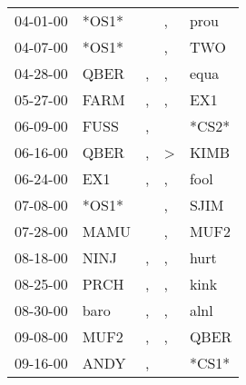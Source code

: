 \begin{supertabular}{p{0.07\textwidth}p{0.06\textwidth}p{0.02\textwidth}p{0.02\textwidth}p{0.06\textwidth}}
          04-01-00\textsuperscript{} &                            *OS1* &                  &                , &           prou\textsuperscript{} \\
          04-07-00\textsuperscript{} &                            *OS1* &                  &                , &            TWO\textsuperscript{} \\
          04-28-00\textsuperscript{} &           QBER\textsuperscript{} &                , &                , &           equa\textsuperscript{} \\
          05-27-00\textsuperscript{} &           FARM\textsuperscript{} &                , &                , &            EX1\textsuperscript{} \\
          06-09-00\textsuperscript{} &           FUSS\textsuperscript{} &                , &                  &                            *CS2* \\
          06-16-00\textsuperscript{} &           QBER\textsuperscript{} &                , &     \textgreater &           KIMB\textsuperscript{} \\
          06-24-00\textsuperscript{} &            EX1\textsuperscript{} &                , &                , &           fool\textsuperscript{} \\
          07-08-00\textsuperscript{} &                            *OS1* &                  &                , &           SJIM\textsuperscript{} \\
          07-28-00\textsuperscript{} &           MAMU\textsuperscript{} &                  &                , &           MUF2\textsuperscript{} \\
          08-18-00\textsuperscript{} &           NINJ\textsuperscript{} &                , &                , &           hurt\textsuperscript{} \\
          08-25-00\textsuperscript{} &           PRCH\textsuperscript{} &                , &                , &           kink\textsuperscript{} \\
          08-30-00\textsuperscript{} &           baro\textsuperscript{} &                , &                , &           alnl\textsuperscript{} \\
          09-08-00\textsuperscript{} &           MUF2\textsuperscript{} &                , &                , &           QBER\textsuperscript{} \\
          09-16-00\textsuperscript{} &           ANDY\textsuperscript{} &                , &                  &                            *CS1* \\

\end{supertabular}
